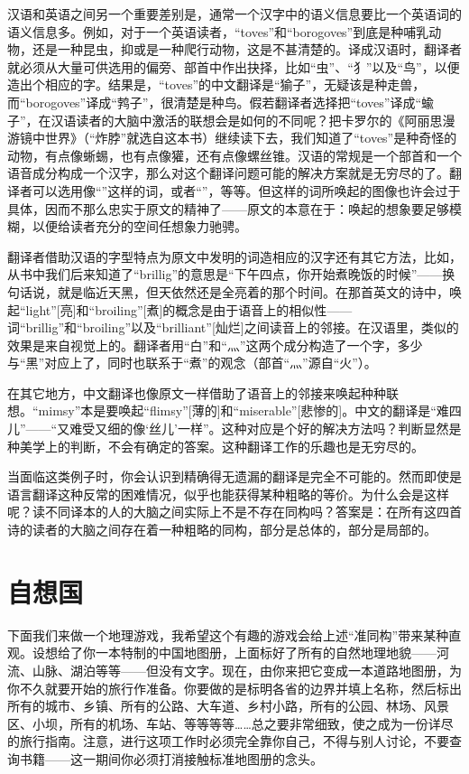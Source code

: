 汉语和英语之间另一个重要差别是，通常一个汉字中的语义信息要比一个英语词的语义信息多。例如，对于一个英语读者，“toves”和“borogoves”到底是种哺乳动物，还是一种昆虫，抑或是一种爬行动物，这是不甚清楚的。译成汉语时，翻译者就必须从大量可供选用的偏旁、部首中作出抉择，比如“虫”、“犭”以及“鸟”，以便造出个相应的字。结果是，“toves”的中文翻译是“㺄子”，无疑该是种走兽，而“borogoves”译成“鹁子”，很清楚是种鸟。假若翻译者选择把“toves”译成“蝓子”，在汉语读者的大脑中激活的联想会是如何的不同呢？把卡罗尔的《阿丽思漫游镜中世界》（“炸脖”就选自这本书）继续读下去，我们知道了“toves”是种奇怪的动物，有点像蜥蜴，也有点像獾，还有点像螺丝锥。汉语的常规是一个部首和一个语音成分构成一个汉字，那么对这个翻译问题可能的解决方案就是无穷尽的了。翻译者可以选用像“”这样的词，或者“”，等等。但这样的词所唤起的图像也许会过于具体，因而不那么忠实于原文的精神了——原文的本意在于：唤起的想象要足够模糊，以便给读者充分的空间任想象力驰骋。

翻译者借助汉语的字型特点为原文中发明的词造相应的汉字还有其它方法，比如，从书中我们后来知道了“brillig”的意思是“下午四点，你开始煮晚饭的时候”——换句话说，就是临近天黑，但天依然还是全亮着的那个时间。在那首英文的诗中，唤起“light”[亮]和“broiling”[煮]的概念是由于语音上的相似性——词“brillig”和“broiling”以及“brilliant”[灿烂]之间读音上的邻接。在汉语里，类似的效果是来自视觉上的。翻译者用“白”和“灬”这两个成分构造了一个字，多少与“黑”对应上了，同时也联系于“煮”的观念（部首“灬”源自“火”）。

在其它地方，中文翻译也像原文一样借助了语音上的邻接来唤起种种联想。“mimsy”本是要唤起“flimsy”[薄的]和“miserable”[悲惨的]。中文的翻译是“难四儿”——“又难受又细的像‘丝儿’一样”。这种对应是个好的解决方法吗？判断显然是种美学上的判断，不会有确定的答案。这种翻译工作的乐趣也是无穷尽的。

当面临这类例子时，你会认识到精确得无遗漏的翻译是完全不可能的。然而即使是语言翻译这种反常的困难情况，似乎也能获得某种粗略的等价。为什么会是这样呢？读不同译本的人的大脑之间实际上不是不存在同构吗？答案是：在所有这四首诗的读者的大脑之间存在着一种粗略的同构，部分是总体的，部分是局部的。

\section{自想国}

下面我们来做一个地理游戏，我希望这个有趣的游戏会给上述“准同构”带来某种直观。设想给了你一本特制的中国地图册，上面标好了所有的自然地理地貌——河流、山脉、湖泊等等——但没有文字。现在，由你来把它变成一本道路地图册，为你不久就要开始的旅行作准备。你要做的是标明各省的边界并填上名称，然后标出所有的城市、乡镇、所有的公路、大车道、乡村小路，所有的公园、林场、风景区、小坝，所有的机场、车站、等等等等……总之要非常细致，使之成为一份详尽的旅行指南。注意，进行这项工作时必须完全靠你自己，不得与别人讨论，不要查询书籍——这一期间你必须打消接触标准地图册的念头。

